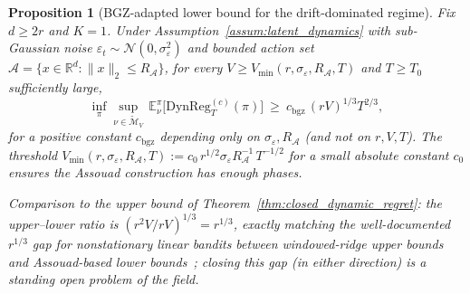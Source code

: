 \documentclass[11pt]{article}
\newcommand{\R}{\mathbb{R}}
\newcommand{\E}{\mathbb{E}}
\newcommand{\cA}{\mathcal{A}}
\newcommand{\DynReg}{\mathrm{DynReg}}
\newtheorem{proposition}{Proposition}
\begin{document}
\begin{proposition}[BGZ-adapted lower bound for the drift-dominated regime]
\label{prop:bgz_lower_bound}
Fix $d\ge 2r$ and $K=1$.  Under Assumption~\ref{assum:latent_dynamics} with
sub-Gaussian noise $\varepsilon_t\sim\mathcal N(0,\sigma_\varepsilon^2)$ and
bounded action set $\cA=\{x\in\R^d:\|x\|_2\le R_\cA\}$, for every
$V\ge V_{\min}(r,\sigma_\varepsilon,R_\cA,T)$ and $T\ge T_0$ sufficiently large,
\begin{equation}
  \inf_\pi\sup_{\nu\in\widetilde{\mathcal M}_V}\,
  \E_\nu^\pi\!\bigl[\DynReg_T^{(c)}(\pi)\bigr]
  \ \ge\ c_{\mathrm{bgz}}\,(rV)^{1/3}T^{2/3},
  \label{eq:bgz_lb}
\end{equation}
for a positive constant $c_{\mathrm{bgz}}$ depending only on $\sigma_\varepsilon,R_\cA$
(and not on $r,V,T$).  The threshold
$V_{\min}(r,\sigma_\varepsilon,R_\cA,T):=c_0\,r^{1/2}\sigma_\varepsilon R_\cA^{-1}\,T^{-1/2}$
for a small absolute constant $c_0$ ensures the Assouad construction has enough
phases.

Comparison to the upper bound of Theorem~\ref{thm:closed_dynamic_regret}:
the upper--lower ratio is $(r^2V/rV)^{1/3}=r^{1/3}$, exactly matching the
well-documented $r^{1/3}$ gap for nonstationary linear bandits between
windowed-ridge upper bounds and Assouad-based lower
bounds~\citep{russac2019weighted,cheung2019learning}; closing this gap (in
either direction) is a standing open problem of the field.
\end{proposition}
\end{document}
